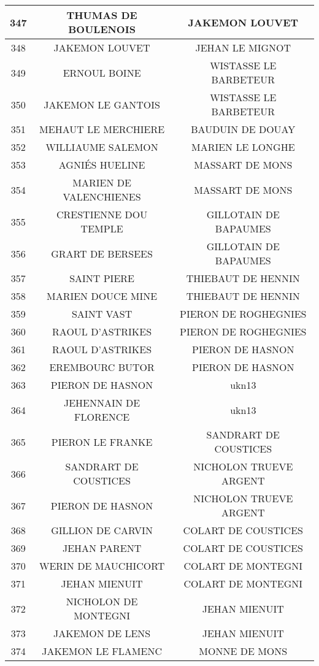 \begin{center}
\begin{longtable}{|c|c|c|}
\hline	347	&	THUMAS DE BOULENOIS	&	JAKEMON LOUVET	\\
\hline	348	&	JAKEMON LOUVET	&	JEHAN LE MIGNOT	\\
\hline	349	&	ERNOUL BOINE	&	WISTASSE LE BARBETEUR	\\
\hline	350	&	JAKEMON LE GANTOIS	&	WISTASSE LE BARBETEUR	\\
\hline	351	&	MEHAUT LE MERCHIERE	&	BAUDUIN DE DOUAY	\\
\hline	352	&	WILLIAUME SALEMON	&	MARIEN LE LONGHE	\\
\hline	353	&	AGNIÉS HUELINE	&	MASSART DE MONS	\\
\hline	354	&	MARIEN DE VALENCHIENES	&	MASSART DE MONS	\\
\hline	355	&	CRESTIENNE DOU TEMPLE	&	GILLOTAIN DE BAPAUMES	\\
\hline	356	&	GRART DE BERSEES	&	GILLOTAIN DE BAPAUMES	\\
\hline	357	&	SAINT PIERE	&	THIEBAUT DE HENNIN	\\
\hline	358	&	MARIEN DOUCE MINE	&	THIEBAUT DE HENNIN	\\
\hline	359	&	SAINT VAST	&	PIERON DE ROGHEGNIES	\\
\hline	360	&	RAOUL D'ASTRIKES	&	PIERON DE ROGHEGNIES	\\
\hline	361	&	RAOUL D'ASTRIKES	&	PIERON DE HASNON	\\
\hline	362	&	EREMBOURC BUTOR	&	PIERON DE HASNON	\\
\hline	363	&	PIERON DE HASNON	&	ukn13	\\
\hline	364	&	JEHENNAIN DE FLORENCE	&	ukn13	\\
\hline	365	&	PIERON LE FRANKE	&	SANDRART DE COUSTICES	\\
\hline	366	&	SANDRART DE COUSTICES	&	NICHOLON TRUEVE ARGENT	\\
\hline	367	&	PIERON DE HASNON	&	NICHOLON TRUEVE ARGENT	\\
\hline	368	&	GILLION DE CARVIN	&	COLART DE COUSTICES	\\
\hline	369	&	JEHAN PARENT	&	COLART DE COUSTICES	\\
\hline	370	&	WERIN DE MAUCHICORT	&	COLART DE MONTEGNI	\\
\hline	371	&	JEHAN MIENUIT	&	COLART DE MONTEGNI	\\
\hline	372	&	NICHOLON DE MONTEGNI	&	JEHAN MIENUIT	\\
\hline	373	&	JAKEMON DE LENS	&	JEHAN MIENUIT	\\
\hline	374	&	JAKEMON LE FLAMENC	&	MONNE DE MONS	\\

\end{longtable}
\end{center}
